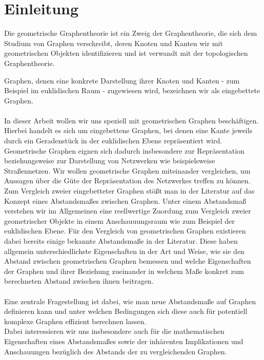 \documentclass[a4paper, 12pt, twoside]{article}
\theoremstyle{Format1} %
\begin{document}
\newpage
\tableofcontents
\newpage\null\thispagestyle{empty}\newpage %
\section{Einleitung}

Die geometrische Graphentheorie ist ein Zweig der Graphentheorie, die sich dem Studium von Graphen verschreibt, deren Knoten und Kanten wir mit geometrischen Objekten identifizieren
und ist verwandt mit der topologischen Graphentheorie.

Graphen, denen eine konkrete Darstellung ihrer Knoten und Kanten - zum Beispiel im euklidischen Raum - zugewiesen wird, bezeichnen wir als eingebettete Graphen.
\\
\\
In dieser Arbeit wollen wir uns speziell mit geometrischen Graphen beschäftigen. Hierbei handelt es sich um eingebettene Graphen,
bei denen eine Kante jeweils durch ein Geradenstück in der euklidischen Ebene repräsentiert wird.
Geometrische Graphen eignen sich dadurch insbesondere zur Repräsentation beziehungsweise zur Darstellung von Netzwerken wie beispielsweise Straßennetzen.
Wir wollen geometrische Graphen miteinander vergleichen, um Aussagen über die Güte der Repräsentation des Netzwerkes treffen zu können.
\\
Zum Vergleich zweier eingebetteter Graphen stößt man in der Literatur auf das Konzept eines Abstandsmaßes zwischen Graphen.
Unter einem Abstandsmaß verstehen wir im Allgemeinen eine reellwertige Zuordung zum Vergleich zweier geometrischer Objekte in einem Anschauuungsraum wie zum Beispiel der euklidischen Ebene.
Für den Vergleich von geometrischen Graphen existieren dabei bereits einige bekannte Abstandsmaße in der Literatur.
Diese haben allgemein unterschiedlichste Eigenschaften in der Art und Weise, wie sie den Abstand zwischen geometrischen Graphen bemessen und welche Eigenschaften der Graphen und ihrer Beziehung
zueinander in welchem Maße konkret zum berechneten Abstand zwischen ihnen beitragen.
\\
\\
Eine zentrale Fragestellung ist dabei, wie man neue Abstandsmaße auf Graphen definieren kann und unter welchen Bedingungen sich diese auch für potentiell komplexe Graphen effizient berechnen lassen.
\\
Dabei interessieren wir uns insbesondere auch für die mathematischen Eigenschaften eines Abstandsmaßes sowie der inhärenten Implikationen und Anschauungen bezüglich des Abstands der zu vergleichenden Graphen.
\end{document}
